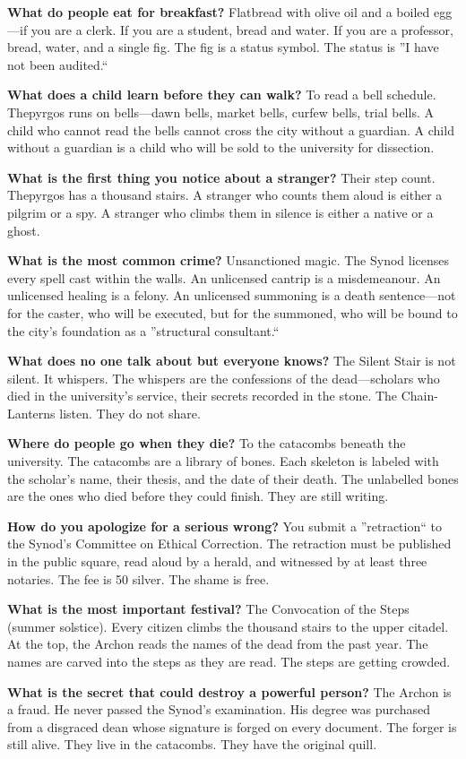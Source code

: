 \begin{almanac}
\textbf{What do people eat for breakfast?} Flatbread with olive oil and a boiled egg---if you are a clerk. If you are a student, bread and water. If you are a professor, bread, water, and a single fig. The fig is a status symbol. The status is ''I have not been audited.``

\textbf{What does a child learn before they can walk?} To read a bell schedule. Thepyrgos runs on bells---dawn bells, market bells, curfew bells, trial bells. A child who cannot read the bells cannot cross the city without a guardian. A child without a guardian is a child who will be sold to the university for dissection.

\textbf{What is the first thing you notice about a stranger?} Their step count. Thepyrgos has a thousand stairs. A stranger who counts them aloud is either a pilgrim or a spy. A stranger who climbs them in silence is either a native or a ghost.

\textbf{What is the most common crime?} Unsanctioned magic. The Synod licenses every spell cast within the walls. An unlicensed cantrip is a misdemeanour. An unlicensed healing is a felony. An unlicensed summoning is a death sentence---not for the caster, who will be executed, but for the summoned, who will be bound to the city's foundation as a ''structural consultant.``

\textbf{What does no one talk about but everyone knows?} The Silent Stair is not silent. It whispers. The whispers are the confessions of the dead---scholars who died in the university's service, their secrets recorded in the stone. The Chain-Lanterns listen. They do not share.

\textbf{Where do people go when they die?} To the catacombs beneath the university. The catacombs are a library of bones. Each skeleton is labeled with the scholar's name, their thesis, and the date of their death. The unlabelled bones are the ones who died before they could finish. They are still writing.

\textbf{How do you apologize for a serious wrong?} You submit a ''retraction`` to the Synod's Committee on Ethical Correction. The retraction must be published in the public square, read aloud by a herald, and witnessed by at least three notaries. The fee is 50 silver. The shame is free.

\textbf{What is the most important festival?} The Convocation of the Steps (summer solstice). Every citizen climbs the thousand stairs to the upper citadel. At the top, the Archon reads the names of the dead from the past year. The names are carved into the steps as they are read. The steps are getting crowded.

\textbf{What is the secret that could destroy a powerful person?} The Archon is a fraud. He never passed the Synod's examination. His degree was purchased from a disgraced dean whose signature is forged on every document. The forger is still alive. They live in the catacombs. They have the original quill.
\end{almanac}

\newpage

\newpage
